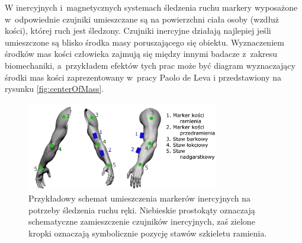 W inercyjnych i~magnetycznych systemach śledzenia ruchu markery wyposażone w~odpowiednie czujniki umieszczane są na powierzchni ciała osoby (wzdłuż kości), której ruch jest śledzony. Czujniki inercyjne działają najlepiej jeśli umieszczone są blisko środka masy poruszającego się obiektu. Wyznaczeniem środków mas kości człowieka zajmują się między innymi badacze z~zakresu biomechaniki, a~przykładem efektów tych prac może być diagram wyznaczający środki mas kości zaprezentowany w~pracy Paolo de Leva \cite{DeLeva1996} i przedstawiony na rysunku \ref{fig:centerOfMass}.
																					
\begin{savenotes}
	\begin{figure}[!htb]
		\centering	
		\includegraphics[width=0.75\textwidth]{images/imuArm.png}
		\caption[Przykładowy schemat umieszczenia markerów inercyjnych na potrzeby śledzenia ruchu ręki]{Przykładowy schemat umieszczenia markerów inercyjnych na potrzeby śledzenia ruchu ręki. Niebieskie prostokąty oznaczają schematyczne zamieszczenie czujników inercyjnych, zaś zielone kropki oznaczają symbolicznie pozycję stawów szkieletu ramienia. }
		\label{fig:literature:imuMarkerPlacementSample}
	\end{figure}
\end{savenotes}
																							
